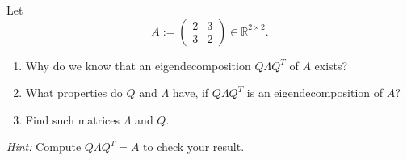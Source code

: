 Let $$A:=\begin{pmatrix}2&3\\3&2 \end{pmatrix} \in \mathbb{R}^{2\times 2}. $$
\begin{enumerate}
	\item Why do we know that an eigendecomposition $Q \Lambda Q^T$ of $A$ exists?
	\item What properties do $Q$ and $\Lambda$ have, if $Q \Lambda Q^T$ is an eigendecomposition of $A$?
	\item Find such matrices $\Lambda$ and $Q$.
\end{enumerate}
\textit{Hint:} Compute $Q \Lambda Q^T = A$ to check your result.

